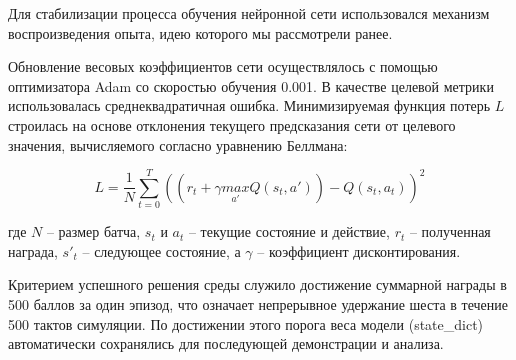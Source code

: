 Для стабилизации процесса обучения нейронной сети использовался механизм воспроизведения опыта, идею которого мы рассмотрели ранее.

Обновление весовых коэффициентов сети осуществлялось с помощью оптимизатора Adam со скоростью обучения 0.001. В качестве целевой метрики использовалась среднеквадратичная ошибка. Минимизируемая функция потерь $L$ строилась на основе отклонения текущего предсказания сети от целевого значения, вычисляемого согласно уравнению Беллмана:

\begin{equation}
  \label{eq:dqn_loss}
  L = \frac{1}{N} \sum_{t=0}^{T} ((r_t + \gamma \underset{a'}{max} Q(s_{t}, a')) - Q(s_t, a_t))^2
\end{equation}

где $N$ -- размер батча, $s_t$ и $a_t$ -- текущие состояние и действие, $r_t$ -- полученная награда, $s'_t$ -- следующее состояние, а $\gamma$ -- коэффициент дисконтирования.

Критерием успешного решения среды служило достижение суммарной награды в 500 баллов за один эпизод, что означает непрерывное удержание шеста в течение 500 тактов симуляции. По достижении этого порога веса модели (state\_dict) автоматически сохранялись для последующей демонстрации и анализа.